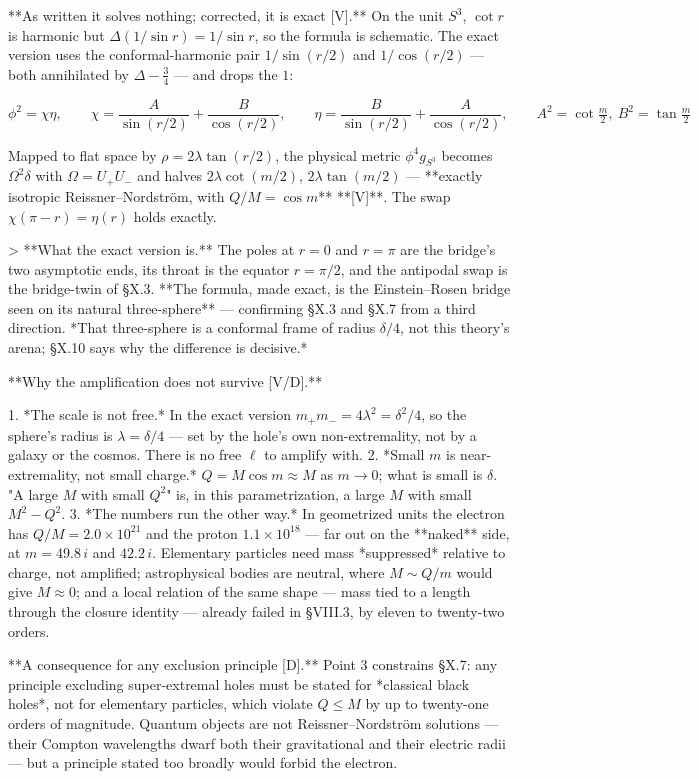 **As written it solves nothing; corrected, it is exact [V].** On the unit $S^3$, $\cot r$ is harmonic but $\Delta(1/\sin r) = 1/\sin r$, so the formula is schematic. The exact version uses the conformal-harmonic pair $1/\sin(r/2)$ and $1/\cos(r/2)$ — both annihilated by $\Delta-\tfrac34$ — and drops the $1$:

$$\phi^2 = \chi\eta,\qquad\chi = \frac{A}{\sin(r/2)}+\frac{B}{\cos(r/2)},\qquad\eta = \frac{B}{\sin(r/2)}+\frac{A}{\cos(r/2)},\qquad A^2 = \cot\tfrac m2,\ B^2 = \tan\tfrac m2$$

Mapped to flat space by $\rho = 2\lambda\tan(r/2)$, the physical metric $\phi^4g_{S^3}$ becomes $\Omega^2\delta$ with $\Omega = U_+U_-$ and halves $2\lambda\cot(m/2)$, $2\lambda\tan(m/2)$ — **exactly isotropic Reissner–Nordström, with $Q/M = \cos m$** **[V]**. The swap $\chi(\pi-r) = \eta(r)$ holds exactly.

> **What the exact version is.** The poles at $r = 0$ and $r = \pi$ are the bridge's two asymptotic ends, its throat is the equator $r = \pi/2$, and the antipodal swap is the bridge-twin of §X.3. **The formula, made exact, is the Einstein–Rosen bridge seen on its natural three-sphere** — confirming §X.3 and §X.7 from a third direction. *That three-sphere is a conformal frame of radius $\delta/4$, not this theory's arena; §X.10 says why the difference is decisive.*

**Why the amplification does not survive [V/D].**

1. *The scale is not free.* In the exact version $m_+m_- = 4\lambda^2 = \delta^2/4$, so the sphere's radius is $\lambda = \delta/4$ — set by the hole's own non-extremality, not by a galaxy or the cosmos. There is no free $\ell$ to amplify with.
2. *Small $m$ is near-extremality, not small charge.* $Q = M\cos m\approx M$ as $m\to0$; what is small is $\delta$. "A large $M$ with small $Q^2$" is, in this parametrization, a large $M$ with small $M^2-Q^2$.
3. *The numbers run the other way.* In geometrized units the electron has $Q/M = 2.0\times10^{21}$ and the proton $1.1\times10^{18}$ — far out on the **naked** side, at $m = 49.8\,i$ and $42.2\,i$. Elementary particles need mass *suppressed* relative to charge, not amplified; astrophysical bodies are neutral, where $M\sim Q/m$ would give $M\approx0$; and a local relation of the same shape — mass tied to a length through the closure identity — already failed in §VIII.3, by eleven to twenty-two orders.

**A consequence for any exclusion principle [D].** Point 3 constrains §X.7: any principle excluding super-extremal holes must be stated for *classical black holes*, not for elementary particles, which violate $Q\leq M$ by up to twenty-one orders of magnitude. Quantum objects are not Reissner–Nordström solutions — their Compton wavelengths dwarf both their gravitational and their electric radii — but a principle stated too broadly would forbid the electron.

